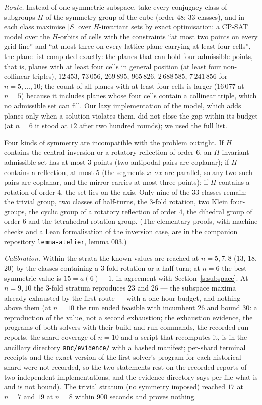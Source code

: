 \documentclass[11pt,a4paper]{article}
\begin{document}
\emph{Route.}  Instead of one symmetric subspace, take every conjugacy class of subgroups $H$
of the symmetry group of the cube (order $48$; $33$ classes), and in each class maximise $|S|$
over $H$-invariant sets by exact optimisation: a CP-SAT model over the $H$-orbits of cells with the
constraints ``at most two points on every grid line'' and ``at most three on every lattice plane
carrying at least four cells'', the plane list computed exactly: the planes that can hold four admissible points,
that is, planes with at least four cells in general position (at least four non-collinear triples), $12\,453$,
$73\,056$, $269\,895$, $965\,826$, $2\,688\,585$, $7\,241\,856$ for $n=5,\dots,10$; the count of all planes with at
least four cells is larger ($16\,077$ at $n=5$) because it includes planes whose four cells contain a collinear
triple, which no admissible set can fill.  Our lazy implementation of the model,
which adds planes only when a solution violates them, did not close the gap within its budget (at
$n=6$ it stood at $12$ after two hundred rounds); we used the full list.

Four kinds of symmetry are incompatible with the problem outright.  If $H$ contains the central
inversion or a rotatory reflection of order $6$, an $H$-invariant admissible set has at most $3$
points (two antipodal pairs are coplanar); if $H$ contains a reflection, at most $5$ (the segments
$x$--$\sigma x$ are parallel, so any two such pairs are coplanar, and the mirror carries at most
three points); if $H$ contains a rotation of order $4$, the set lies on the axis.  Only nine of the
$33$ classes remain: the trivial group, two classes of half-turns, the $3$-fold rotation, two
Klein four-groups, the cyclic group of a rotatory reflection of order $4$, the dihedral group
of order $6$ and the tetrahedral rotation group.  (The elementary proofs, with machine checks
and a Lean formalisation of the inversion case, are in the companion repository
\texttt{lemma-atelier}, lemma 003.)

\emph{Calibration.}  Within the strata the known values are reached at $n=5,7,8$ ($13$, $18$,
$20$) by the classes containing a $3$-fold rotation or a half-turn; at $n=6$ the best symmetric
value is $15=a(6)-1$, in agreement with Section~\ref{s:subspace}.  At $n=9,10$ the $3$-fold
stratum reproduces $23$ and $26$ --- the subspace maxima already exhausted by the first route ---
with a one-hour budget, and nothing above them (at $n=10$ the run ended feasible with incumbent $26$
and bound $30$: a reproduction of the value, not a second exhaustion; the exhaustion evidence, the
programs of both solvers with their build and run commands, the recorded run reports, the shard coverage
of $n=10$ and a script that recomputes it, is in the ancillary directory \texttt{anc/evidence/} with a
hashed manifest; per-shard terminal receipts and the exact version of the first solver's program for
each historical shard were not recorded, so the two statements rest on the recorded reports of two
independent implementations, and the evidence directory says per file what is and is not bound).  The trivial stratum (no symmetry imposed)
reached $17$ at $n=7$ and $19$ at $n=8$ within $900$ seconds and proves nothing.
\end{document}
